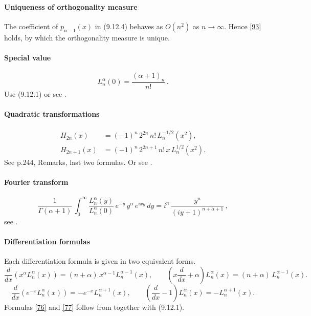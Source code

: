 \documentclass[twoside,11pt]{article}
\newcommand\al\alpha
\newcommand\Ga{\Gamma}
\newcommand\iy\infty
\begin{document}
\paragraph{Uniqueness of orthogonality measure}
The coefficient of $p_{n-1}(x)$ in (9.12.4) behaves as $O(n^2)$ as $n\to\iy$.
Hence \eqref{93} holds, by which the orthogonality measure is unique.
%
\paragraph{Special value}
\begin{equation}
L_n^{\al}(0)=\frac{(\al+1)_n}{n!}\,.
\label{53}
\end{equation}
Use (9.12.1) or see .
%
\paragraph{Quadratic transformations}
\begin{align}
H_{2n}(x)&=(-1)^n\,2^{2n}\,n!\,L_n^{-1/2}(x^2),
\label{54}\\
H_{2n+1}(x)&=(-1)^n\,2^{2n+1}\,n!\,x\,L_n^{1/2}(x^2).
\label{55}
\end{align}
See p.244, Remarks, last two formulas.
Or see .
%
\paragraph{Fourier transform}
\begin{equation}
\frac1{\Ga(\al+1)}\,\int_0^\iy \frac{L_n^\al(y)}{L_n^\al(0)}\,
e^{-y}\,y^\al\,e^{ixy}\,dy=
i^n\,\frac{y^n}{(iy+1)^{n+\al+1}}\,,
\label{14}
\end{equation}
see .
%
\paragraph{Differentiation formulas}
Each differentiation formula is given in two equivalent forms.
\begin{equation}
\frac d{dx}\left(x^\al L_n^\al(x)\right)=
(n+\al)\,x^{\al-1} L_n^{\al-1}(x),\qquad
\left(x\frac d{dx}+\al\right)L_n^\al(x)=
(n+\al)\,L_n^{\al-1}(x).
\label{76}
\end{equation}
%
\begin{equation}
\frac d{dx}\left(e^{-x} L_n^\al(x)\right)=
-e^{-x} L_n^{\al+1}(x),\qquad
\left(\frac d{dx}-1\right)L_n^\al(x)=
-L_n^{\al+1}(x).
\label{77}
\end{equation}
%
Formulas \eqref{76} and \eqref{77} follow from
together with (9.12.1). 
%
\end{document}
